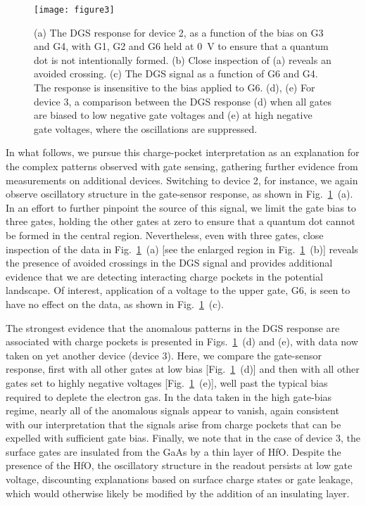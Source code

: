 \begin{figure}
\texttt{[image: figure3]}
\caption[Sensitivity of charge pockets to different gate configurations]{\label{fig:pock_fig3} (a) The DGS response for device 2, as a function of the bias on G3 and G4, with G1, G2 and G6 held at \SI{0}{\volt} to ensure that a quantum dot is not intentionally formed. (b) Close inspection of (a) reveals an avoided crossing. (c) The DGS signal as a function of G6 and G4. The response is insensitive to the bias applied to G6. (d), (e) For device 3, a comparison between the DGS response (d) when all gates are biased to low negative gate voltages and (e) at high negative gate voltages, where the oscillations are suppressed.}
\end{figure}

In what follows, we pursue this charge-pocket interpretation as an explanation for the complex patterns observed with gate sensing, gathering further evidence from measurements on additional devices.  Switching to device 2, for instance, we again observe oscillatory structure in the gate-sensor response, as shown in Fig.~\ref{fig:pock_fig3}~(a). In an effort to further pinpoint the source of this signal, we limit the gate bias to three gates, holding the other gates at zero to ensure that a quantum dot cannot be formed in the central region.  Nevertheless, even with three gates, close inspection of the data in Fig.~\ref{fig:pock_fig3}~(a) [see the enlarged region in Fig.~\ref{fig:pock_fig3}~(b)] reveals the presence of avoided crossings in the DGS signal and provides additional evidence that we are detecting interacting charge pockets in the potential landscape. Of interest, application of a voltage to the upper gate, G6, is seen to have no effect on the data, as shown in Fig.~\ref{fig:pock_fig3}~(c).

The strongest evidence that the anomalous patterns in the DGS response are associated with charge pockets is presented in Figs.~\ref{fig:pock_fig3}~(d) and (e), with data now taken on yet another device (device 3). Here, we compare the gate-sensor response, first with all other gates at low bias [Fig.~\ref{fig:pock_fig3}~(d)] and then with all other gates set to highly negative voltages [Fig.~\ref{fig:pock_fig3}~(e)], well past the typical bias required to deplete the electron gas. In the data taken in the high gate-bias regime, nearly all of the anomalous signals appear to vanish, again consistent with our interpretation that the signals arise from charge pockets that can be expelled with sufficient gate bias. Finally, we note that in the case of device 3, the surface gates are insulated from the GaAs by a thin layer of HfO. Despite the presence of the HfO, the oscillatory structure in the readout persists at low gate voltage, discounting explanations based on surface charge states or gate leakage, which would otherwise likely be modified by the addition of an insulating layer.

